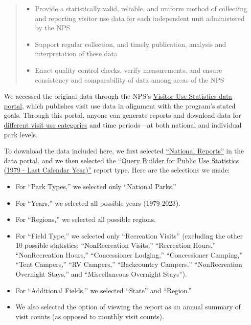 \documentclass[
  letterpaper,
  DIV=11,
  numbers=noendperiod]{scrartcl}
\providecommand{\tightlist}{%
  \setlength{\itemsep}{0pt}\setlength{\parskip}{0pt}}\usepackage{longtable,booktabs,array}
\begin{document}
\begin{quote}
\begin{itemize}
\tightlist
\item
  Provide a statistically valid, reliable, and uniform method of
  collecting and reporting visitor use data for each independent unit
  administered by the NPS
\item
  Support regular collection, and timely publication, analysis and
  interpretation of these data
\item
  Enact quality control checks, verify measurements, and ensure
  consistency and comparability of data among areas of the NPS
\end{itemize}
\end{quote}

We accessed the original data through the NPS's
\href{https://irma.nps.gov/Stats/}{Visitor Use Statistics data portal},
which publishes visit use data in alignment with the program's stated
goals. Through this portal, anyone can generate reports and download
data for \href{https://irma.nps.gov/Stats/Reports/National}{different
visit use categories} and time periods---at both national and individual
park levels.

To download the data included here, we first selected
\href{https://irma.nps.gov/Stats/Reports/National}{``National Reports''}
in the data portal, and we then selected the
\href{https://irma.nps.gov/Stats/SSRSReports/National\%20Reports/Query\%20Builder\%20for\%20Public\%20Use\%20Statistics\%20(1979\%20-\%20Last\%20Calendar\%20Year)}{``Query
Builder for Public Use Statistics (1979 - Last Calendar Year)''} report
type. Here are the selections we made:

\begin{itemize}
\tightlist
\item
  For ``Park Types,'' we selected only ``National Parks.''
\item
  For ``Years,'' we selected all possible years (1979-2023).
\item
  For ``Regions,'' we selected all possible regions.
\item
  For ``Field Type,'' we selected only ``Recreation Visits'' (excluding
  the other 10 possible statistics: ``NonRecreation Visits,''
  ``Recreation Hours,'' ``NonRecreation Hours,'' ``Concessioner
  Lodging,'' ``Concessioner Camping,'' ``Tent Campers,'' ``RV Campers,''
  ``Backcountry Campers,'' ``NonRecreation Overnight Stays,'' and
  ``Miscellaneous Overnight Stays'').
\item
  For ``Additional Fields,'' we selected ``State'' and ``Region.''
\item
  We also selected the option of viewing the report as an annual summary
  of visit counts (as opposed to monthly visit counts).
\end{itemize}
\end{document}
